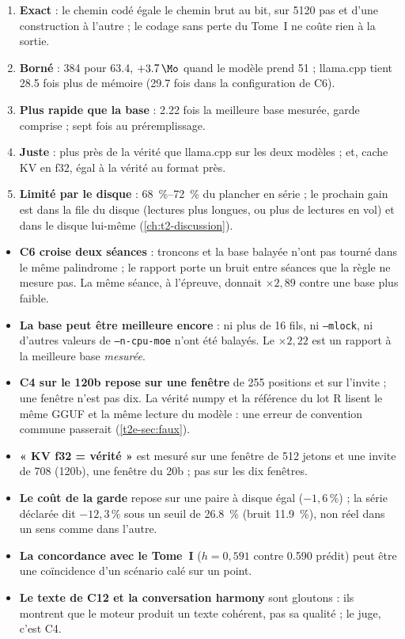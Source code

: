 \begin{enumerate}
\item \textbf{Exact} : le chemin codé égale le chemin brut au bit, sur \num{5120} pas et d'une construction à l'autre ; le codage sans perte du Tome~I ne coûte rien à la sortie.
\item \textbf{Borné} : \SI{384}{\Mo} pour \SI{63.4}{\Go}, $+\SI{3.7}{\Mo}$ quand le modèle prend \SI{51}{\Go} ; llama.cpp tient \num{28.5} fois plus de mémoire (\num{29.7} fois dans la configuration de C6).
\item \textbf{Plus rapide que la base} : \num{2.22} fois la meilleure base mesurée, garde comprise ; sept fois au préremplissage.
\item \textbf{Juste} : plus près de la vérité que llama.cpp sur les deux modèles ; et, cache KV en f32, égal à la vérité au format près.
\item \textbf{Limité par le disque} : \SIrange{68}{72}{\percent} du plancher en série ; le prochain gain est dans la file du disque (lectures plus longues, ou plus de lectures en vol) et dans le disque lui-même (\cref{ch:t2-discussion}).
\end{enumerate}

\begin{faux}
\begin{itemize}
\item \textbf{C6 croise deux séances} : troncons et la base balayée n'ont pas tourné dans le même palindrome ; le rapport porte un bruit entre séances que la règle ne mesure pas. La même séance, à l'épreuve, donnait $\times 2{,}89$ contre une base plus faible.
\item \textbf{La base peut être meilleure encore} : ni plus de 16 fils, ni \texttt{--mlock}, ni d'autres valeurs de \texttt{--n-cpu-moe} n'ont été balayés. Le $\times 2{,}22$ est un rapport à la meilleure base \emph{mesurée}.
\item \textbf{C4 sur le 120b repose sur une fenêtre} de 255 positions et sur l'invite ; une fenêtre n'est pas dix. La vérité numpy et la référence du lot R lisent le même GGUF et la même lecture du modèle : une erreur de convention commune passerait (\cref{t2e-sec:faux}).
\item \textbf{« KV f32 = vérité »} est mesuré sur une fenêtre de 512 jetons et une invite de 708 (120b), une fenêtre du 20b ; pas sur les dix fenêtres.
\item \textbf{Le coût de la garde} repose sur une paire à disque égal ($-1{,}6\,\%$) ; la série déclarée dit $-12{,}3\,\%$ sous un seuil de \SI{26.8}{\percent} (bruit \SI{11.9}{\percent}), non réel dans un sens comme dans l'autre.
\item \textbf{La concordance avec le Tome~I} ($h = 0{,}591$ contre \num{0.590} prédit) peut être une coïncidence d'un scénario calé sur un point.
\item \textbf{Le texte de C12 et la conversation harmony} sont gloutons : ils montrent que le moteur produit un texte cohérent, pas sa qualité ; le juge, c'est C4.
\end{itemize}
\end{faux}
